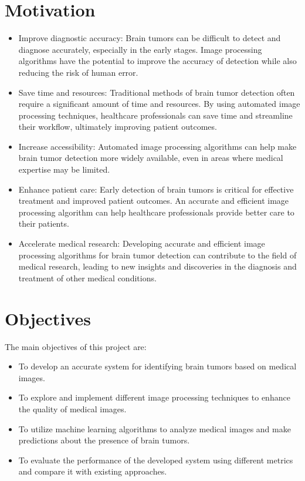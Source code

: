 \documentclass{article}
\begin{document}
\section{Motivation}
\begin{itemize}
    \item Improve diagnostic accuracy: Brain tumors can be difficult to detect and diagnose accurately, especially in the early stages. Image processing algorithms have the potential to improve the accuracy of detection while also reducing the risk of human error.

\item Save time and resources: Traditional methods of brain tumor detection often require a significant amount of time and resources. By using automated image processing techniques, healthcare professionals can save time and streamline their workflow, ultimately improving patient outcomes.

\item Increase accessibility: Automated image processing algorithms can help make brain tumor detection more widely available, even in areas where medical expertise may be limited.

\item Enhance patient care: Early detection of brain tumors is critical for effective treatment and improved patient outcomes. An accurate and efficient image processing algorithm can help healthcare professionals provide better care to their patients.

\item Accelerate medical research: Developing accurate and efficient image processing algorithms for brain tumor detection can contribute to the field of medical research, leading to new insights and discoveries in the diagnosis and treatment of other medical conditions.
\end{itemize}



\section{Objectives}
The main objectives of this project are:
\begin{itemize}
    \item To develop an accurate system for identifying brain tumors based on medical images.
    
\item To explore and implement different image processing techniques to enhance the quality of medical images.
\item  To utilize machine learning algorithms to analyze medical images and make predictions about the presence of brain tumors.
\item To evaluate the performance of the developed system using different metrics and compare it with existing approaches.
\end{itemize}
\newpage
\end{document}
